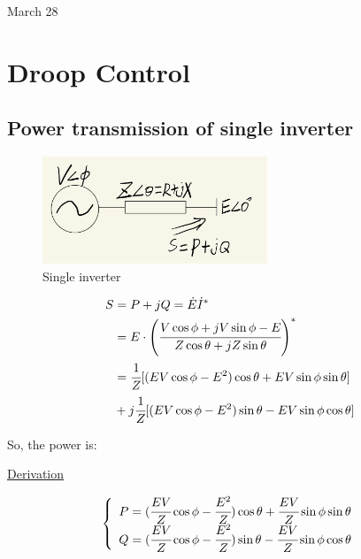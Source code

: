 \univlogo

{\Huge March 28}\vspace{5mm}

\section*{Droop Control}


\subsection*{Power transmission of single inverter}

\begin{figure}[H]
\centering
\includegraphics[width=0.6\textwidth]{./2023Mar/SingleInverter.png}
\caption{Single inverter}
\label{SingleInverter}
\end{figure}

\begin{equation}
\begin{aligned}
    S&=P+jQ=\dot{E}\dot{I}^* \\
    &=E\cdot \left (\cfrac{V\cos{\phi}+jV\sin{\phi}-E}{Z\cos{\theta}+jZ\sin{\theta}} \right )^*\\
    &=\cfrac{1}{Z}[(EV\cos{\phi}-E^2)\cos{\theta}+EV\sin{\phi}\sin{\theta}]\\
    &+j\cfrac{1}{Z}[(EV\cos{\phi}-E^2)\sin{\theta}-EV\sin{\phi}\cos{\theta}]
\end{aligned}
\end{equation}

So, the power is:

\href{run:./2023Mar/Derivation.jpg}{Derivation} 

\begin{equation}
\begin{aligned}
\left\{\begin{array}{l}
    P=(\cfrac{EV}{Z}\cos{\phi}-\cfrac{E^2}{Z})\cos{\theta}+\cfrac{EV}{Z}\sin{\phi}\sin{\theta}    \\
    Q=(\cfrac{EV}{Z}\cos{\phi}-\cfrac{E^2}{Z})\sin{\theta}-\cfrac{EV}{Z}\sin{\phi}\cos{\theta}
\end{array}\right.
\end{aligned}
\end{equation}

